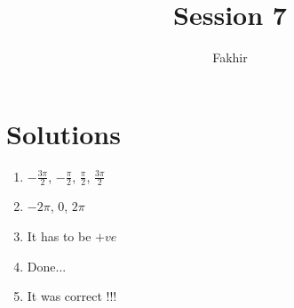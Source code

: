 \documentclass[]{article}
\title{Session 7}
\author{Fakhir}
\begin{document}
\maketitle

\section*{Solutions}

\begin{enumerate}
	\item $-\frac{3\pi}{2}$, $-\frac{\pi}{2}$, $\frac{\pi}{2}$, $\frac{3\pi}{2}$
	\item $-2\pi$, $0$, $2\pi$
	\item It has to be $+ve$
	\item Done...
	\item It was correct !!!
\end{enumerate}
\end{document}

